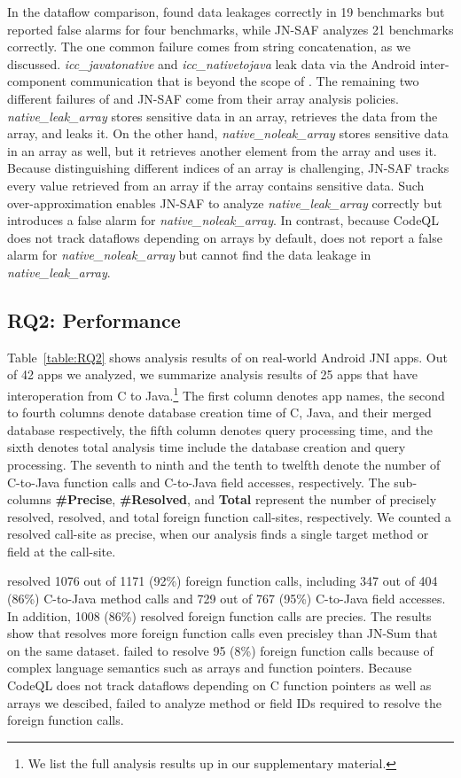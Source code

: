 In the dataflow comparison, \ours found data leakages correctly in 19
benchmarks but reported false alarms for four benchmarks, while JN-SAF
analyzes 21 benchmarks correctly. 
The one common failure comes from string concatenation, as we discussed.
{\it icc\_javatonative} and {\it icc\_nativetojava} leak data via the Android
inter-component communication that is beyond the scope of \ours.
The remaining two different failures of \ours and JN-SAF come from their array analysis policies.
{\it native\_leak\_array} stores sensitive data in an array, retrieves the data from the array,
and leaks it.  On the other hand, {\it native\_noleak\_array} stores sensitive
data in an array as well, but it retrieves another element from the array and uses it.
Because distinguishing different indices of an array is challenging, JN-SAF
tracks every value retrieved from an array if the array contains sensitive data.
Such over-approximation enables JN-SAF to analyze {\it
native\_leak\_array} correctly but introduces a false alarm for {\it
native\_noleak\_array}.  In contrast, because CodeQL does not
track dataflows depending on arrays by default, \ours does not report
a false alarm for {\it native\_noleak\_array} but cannot find the data leakage in {\it
native\_leak\_array}.


\subsection{RQ2: Performance}
Table~\ref{table:RQ2} shows analysis results of \ours on real-world Android
JNI apps. Out of 42 apps we analyzed, we summarize analysis
results of 25 apps that have interoperation from C to Java.\footnote{We
list the full analysis results up in our supplementary material.} The first
column denotes app names, the second to fourth columns denote database
creation time of C, Java, and their merged database respectively, the fifth
column denotes query processing time, and the sixth denotes total analysis time
include the database creation and query processing. The seventh to ninth and
the tenth to twelfth denote the number of C-to-Java function calls and
C-to-Java field accesses, respectively. The sub-columns {\bf \#Precise}, {\bf
\#Resolved}, and {\bf Total} represent the number of precisely resolved,
resolved, and total foreign function call-sites, respectively. We counted a
resolved call-site as precise, when our analysis finds a single target method
or field at the call-site.


\ours resolved 1076 out of 1171 (92\%) foreign function calls, including
347 out of 404 (86\%) C-to-Java method calls and 729 out of 767 (95\%)
C-to-Java field accesses. In addition, 1008 (86\%) resolved foreign function
calls are precies. The results show that \ours resolves more foreign
function calls even precisley than JN-Sum that  on the same
dataset. \ours failed to resolve 95 (8\%) foreign function calls because
of complex language semantics such as arrays and function pointers. Because
CodeQL does not track dataflows depending on C function pointers as well as
arrays we descibed, \ours failed to analyze method or field IDs required
to resolve the foreign function calls.

